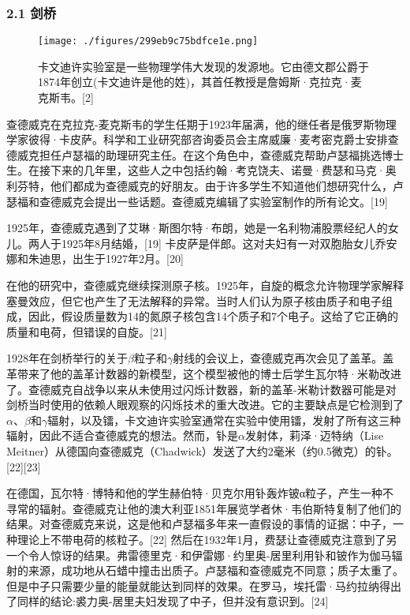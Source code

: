 \subsubsection{2.1 剑桥}
\begin{figure}[ht]
\centering
\texttt{[image: ./figures/299eb9c75bdfce1e.png]}
\caption{卡文迪许实验室是一些物理学伟大发现的发源地。它由德文郡公爵于1874年创立(卡文迪许是他的姓)，其首任教授是詹姆斯·克拉克·麦克斯韦。[2]} \label{fig_CHFR_1}
\end{figure}
查德威克在克拉克-麦克斯韦的学生任期于1923年届满，他的继任者是俄罗斯物理学家彼得·卡皮萨。科学和工业研究部咨询委员会主席威廉·麦考密克爵士安排查德威克担任卢瑟福的助理研究主任。在这个角色中，查德威克帮助卢瑟福挑选博士生。在接下来的几年里，这些人之中包括约翰·考克饶夫、诺曼·费瑟和马克·奥利芬特，他们都成为查德威克的好朋友。由于许多学生不知道他们想研究什么，卢瑟福和查德威克会提出一些话题。查德威克编辑了实验室制作的所有论文。[19]

1925年，查德威克遇到了艾琳·斯图尔特·布朗，她是一名利物浦股票经纪人的女儿。两人于1925年8月结婚，[19] 卡皮萨是伴郎。这对夫妇有一对双胞胎女儿乔安娜和朱迪思，出生于1927年2月。[20]

在他的研究中，查德威克继续探测原子核。1925年，自旋的概念允许物理学家解释塞曼效应，但它也产生了无法解释的异常。当时人们认为原子核由质子和电子组成，因此，假设质量数为14的氮原子核包含14个质子和7个电子。这给了它正确的质量和电荷，但错误的自旋。[21]

1928年在剑桥举行的关于$\beta$粒子和$\gamma$射线的会议上，查德威克再次会见了盖革。盖革带来了他的盖革计数器的新模型，这个模型被他的博士后学生瓦尔特·米勒改进了。查德威克自战争以来从未使用过闪烁计数器，新的盖革-米勒计数器可能是对剑桥当时使用的依赖人眼观察的闪烁技术的重大改进。它的主要缺点是它检测到了$\alpha$、$\beta$和$\gamma$辐射，以及镭，卡文迪许实验室通常在实验中使用镭，发射了所有这三种辐射，因此不适合查德威克的想法。然而，钋是$\alpha$发射体，莉泽·迈特纳（Lise Meitner）从德国向查德威克（Chadwick）发送了大约2毫米（约0.5微克）的钋。[22][23]

在德国，瓦尔特·博特和他的学生赫伯特·贝克尔用钋轰炸铍α粒子，产生一种不寻常的辐射。查德威克让他的澳大利亚1851年展览学者休·韦伯斯特复制了他们的结果。对查德威克来说，这是他和卢瑟福多年来一直假设的事情的证据：中子，一种理论上不带电荷的核粒子。[22] 然后在1932年1月，费瑟让查德威克注意到了另一个令人惊讶的结果。弗雷德里克·和伊雷娜·约里奥-居里利用钋和铍作为伽马辐射的来源，成功地从石蜡中撞击出质子。卢瑟福和查德威克不同意；质子太重了。但是中子只需要少量的能量就能达到同样的效果。在罗马，埃托雷·马约拉纳得出了同样的结论:裘力奥-居里夫妇发现了中子，但并没有意识到。[24]

